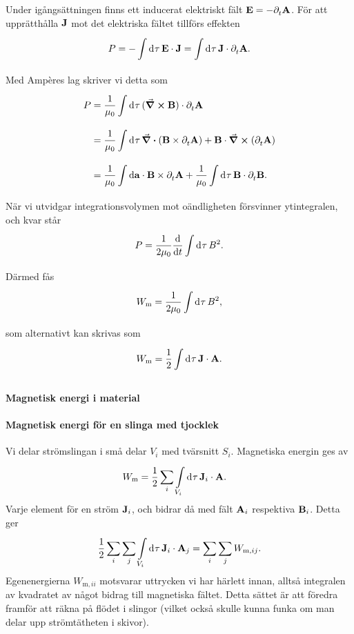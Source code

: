 Under igångsättningen finns ett inducerat elektriskt fält $\vb{E} = -\partial_{t}^{}\vb{A}$. För att upprätthålla $\vb{J}$ mot det elektriska fältet tillförs effekten
\begin{align*}
	P = -\int\limits_{}^{}\dd[]{\tau}\vb{E}\cdot\vb{J} = \int\limits_{}^{}\dd[]{\tau}\vb{J}\cdot\partial_{t}^{}\vb{A}.
\end{align*}
Med Ampères lag skriver vi detta som
\begin{align*}
	P &= \frac{1}{\mu_{0}}\int\limits_{}^{}\dd[]{\tau}(\curl{\vb{B}})\cdot\partial_{t}^{}\vb{A} \\
	  &= \frac{1}{\mu_{0}}\int\limits_{}^{}\dd[]{\tau}\div(\vb{B}\times\partial_{t}^{}\vb{A}) + \vb{B}\cdot\curl(\partial_{t}^{}\vb{A}) \\
	  &= \frac{1}{\mu_{0}}\int\limits_{}^{}\dd{\vb{a}}\cdot \vb{B}\times\partial_{t}^{}\vb{A} + \frac{1}{\mu_{0}}\int\limits_{}^{}\dd[]{\tau}\vb{B}\cdot\partial_{t}^{}\vb{B}.
\end{align*}
När vi utvidgar integrationsvolymen mot oändligheten försvinner ytintegralen, och kvar står
\begin{align*}
	P = \frac{1}{2\mu_{0}}\dv{t}\int\limits_{}^{}\dd[]{\tau}B^{2}.
\end{align*}
Därmed fås
\begin{align*}
	W_{\text{m}} = \frac{1}{2\mu_{0}}\int\limits_{}^{}\dd[]{\tau}B^{2},
\end{align*}
som alternativt kan skrivas som
\begin{align*}
	W_{\text{m}} = \frac{1}{2}\int\limits_{}^{}\dd[]{\tau}\vb{J}\cdot\vb{A}.
\end{align*}

\paragraph{Magnetisk energi i material}

\paragraph{Magnetisk energi för en slinga med tjocklek}
Vi delar strömslingan i små delar $V_{i}$ med tvärsnitt $S_{i}$. Magnetiska energin ges av
\begin{align*}
	W_{\text{m}} &= \frac{1}{2}\sum\limits_{i}\int\limits_{V_{i}}^{}\dd[]{\tau}\vb{J}_{i}\cdot\vb{A}.
\end{align*}
Varje element för en ström $\vb{J}_{i}$, och bidrar då med fält $\vb{A}_{i}$ respektiva $\vb{B}_{i}$. Detta ger
\begin{align*}
	\frac{1}{2}\sum\limits_{i}\sum\limits_{j}\int\limits_{V_{i}}^{}\dd[]{\tau}\vb{J}_{i}\cdot\vb{A}_{j} = \sum\limits_{i}\sum\limits_{j}W_{\text{m}, ij}.
\end{align*}
Egenenergierna $W_{\text{m}, ii}$ motsvarar uttrycken vi har härlett innan, alltså integralen av kvadratet av något bidrag till magnetiska fältet. Detta sättet är att föredra framför att räkna på flödet i slingor (vilket också skulle kunna funka om man delar upp strömtätheten i skivor).

